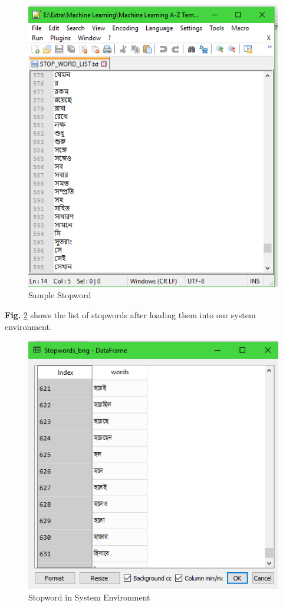 \documentclass[12pt,a4paper]{report}
\begin{document}
\begin{figure}[h!]
    \centering
    \includegraphics[scale=0.55]{Figures/stp_wrd.PNG}
    \caption{Sample Stopword}
    \label{fig:stpw}
\end{figure}
\par\noindent

\textbf{Fig.} \ref{fig:lstpw} shows the list of stopwords after loading them into our system environment.
\begin{figure}[h!]
    \centering
    \includegraphics[scale=0.6]{Figures/lstp_wrd.PNG}
    \caption{Stopword in System Environment}
    \label{fig:lstpw}
\end{figure}
\end{document}
